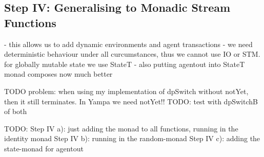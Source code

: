 \subsection{Step IV: Generalising to Monadic Stream Functions}
- this allows us to add dynamic environments and agent transactions
- we need deterministic behaviour under all curcumstances, thus we cannot use IO or STM. for globally mutable state we use StateT
- also putting agentout into StateT monad composes now much better

TODO problem: when using my implementation of dpSwitch without notYet, then it still terminates. In Yampa we need notYet!!
TODO: test with dpSwitchB of both 

TODO:
Step IV a): just adding the monad to all functions, running in the identity monad
Step IV b): running in the random-monad
Step IV c): adding the state-monad for agentout
